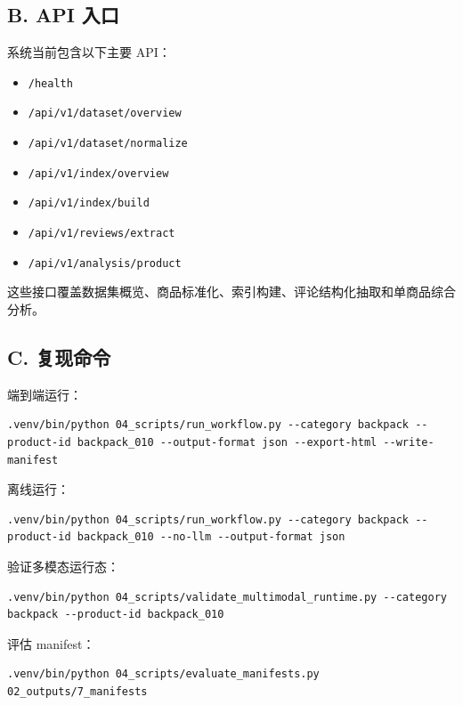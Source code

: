 \documentclass[11pt]{article}
\providecommand{\tightlist}{\setlength{\itemsep}{0pt}\setlength{\parskip}{0pt}}
\begin{document}
\subsection{B. API 入口}

系统当前包含以下主要 API：

\begin{itemize}
\tightlist
\item
  \texttt{/health}
\item
  \texttt{/api/v1/dataset/overview}
\item
  \texttt{/api/v1/dataset/normalize}
\item
  \texttt{/api/v1/index/overview}
\item
  \texttt{/api/v1/index/build}
\item
  \texttt{/api/v1/reviews/extract}
\item
  \texttt{/api/v1/analysis/product}
\end{itemize}

这些接口覆盖数据集概览、商品标准化、索引构建、评论结构化抽取和单商品综合分析。

\subsection{C. 复现命令}

端到端运行：

\begin{verbatim}
.venv/bin/python 04_scripts/run_workflow.py --category backpack --product-id backpack_010 --output-format json --export-html --write-manifest
\end{verbatim}

离线运行：

\begin{verbatim}
.venv/bin/python 04_scripts/run_workflow.py --category backpack --product-id backpack_010 --no-llm --output-format json
\end{verbatim}

验证多模态运行态：

\begin{verbatim}
.venv/bin/python 04_scripts/validate_multimodal_runtime.py --category backpack --product-id backpack_010
\end{verbatim}

评估 manifest：

\begin{verbatim}
.venv/bin/python 04_scripts/evaluate_manifests.py 02_outputs/7_manifests
\end{verbatim}
\end{document}
